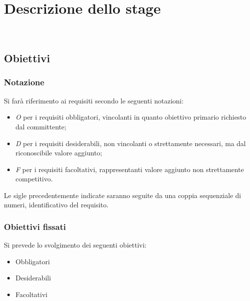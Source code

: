 
\chapter{Descrizione dello stage}
\label{cap:descrizione-stage}

\\

\section{Obiettivi}
\subsection*{Notazione}
Si farà riferimento ai requisiti secondo le seguenti notazioni:
\begin{itemize}
	\item \textit{O} per i requisiti obbligatori, vincolanti in quanto obiettivo primario richiesto dal committente;
	\item \textit{D} per i requisiti desiderabili, non vincolanti o strettamente necessari,
		  ma dal riconoscibile valore aggiunto;
	\item \textit{F} per i requisiti facoltativi, rappresentanti valore aggiunto non strettamente 
		  competitivo.
\end{itemize}

Le sigle precedentemente indicate saranno seguite da una coppia sequenziale di numeri, identificativo del requisito.

\subsection*{Obiettivi fissati}
Si prevede lo svolgimento dei seguenti obiettivi:
\begin{itemize}
	\item Obbligatori
	\begin{itemize}
		\obiettiviObbligatori
	\end{itemize}
	
	\item Desiderabili 
	\begin{itemize}
		\obiettiviDesiderabili
	\end{itemize}
	
	\item Facoltativi
	\begin{itemize}
		\obiettiviFacoltativi
	\end{itemize} 
\end{itemize}

